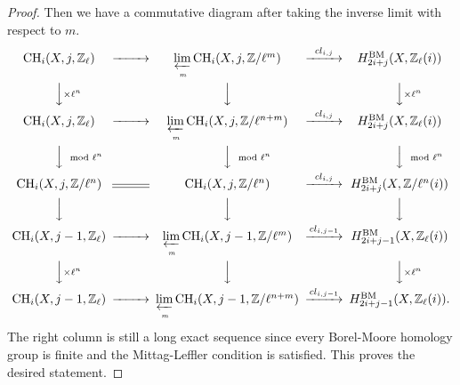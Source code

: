 \documentclass{amsart}
\theoremstyle{definition}
\theoremstyle{remark}
\newcommand{\mbb}{\mathbb}
\newcommand{\ZZ}{\mbb{Z}}
\begin{document}
\begin{proof}
    Then we have a commutative diagram after taking the inverse limit with respect to $m$.
    \[
    \begin{CD}
         \text{CH}_i(X, j, \ZZ_\ell) @>>> \lim \limits_{\xleftarrow[m]{}}\text{CH}_i(X, j, \ZZ/\ell^m) @>cl_{i, j}>> H_{2i+j}^{\text{BM}}(X, \ZZ_\ell(i)) \\
        @VV\times \ell^n V @VVV @VV\times \ell^nV \\
         \text{CH}_i(X, j, \ZZ_\ell) @>>> \lim \limits_{\xleftarrow[m]{}}\text{CH}_i(X, j, \ZZ/{\ell^{n+m}}) @>cl_{i, j}>> H_{2i+j}^{\text{BM}}(X, \ZZ_\ell(i))\\
        @VV\mod \ell^n V @VV\mod \ell^n V @VV\mod \ell^n V \\
          \text{CH}_i(X, j, \ZZ/\ell^n) @=\text{CH}_i(X, j, \ZZ/\ell^n) @>cl_{i, j}>> H_{2i+j}^{\text{BM}}(X, \ZZ/{\ell^n}(i))\\
          @VVV @VVV @VVV\\
          \text{CH}_i(X, j-1, \ZZ_\ell)@>>> \lim \limits_{\xleftarrow[m]{}}\text{CH}_i(X, j-1, \ZZ/\ell^m) @>cl_{i, j-1}>> H_{2i+j-1}^{\text{BM}}(X, \ZZ_\ell(i))\\
          @VV\times \ell^n V @VVV @VV\times \ell^nV \\
         \text{CH}_i(X, j-1, \ZZ_\ell) @>>> \lim \limits_{\xleftarrow[m]{}}\text{CH}_i(X, j-1, \ZZ/{\ell^{n+m}}) @>cl_{i, j-1}>> H_{2i+j-1}^{\text{BM}}(X, \ZZ_\ell(i)).
    \end{CD}
    \]
    The right column is still a long exact sequence since every Borel-Moore homology group is finite and the Mittag-Leffler condition is satisfied.
    This proves the desired statement.
\end{proof}
     
\end{document}

